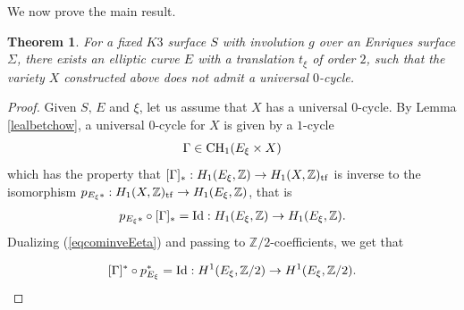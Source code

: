 \documentclass[10pt]{article}
\newtheorem{theo}{Theorem}[section]
\begin{document}
We now prove the main result.
\begin{theo} \label{theoexample} For a fixed $K3$ surface $S$ with involution $g$ over an Enriques surface $\Sigma$, there exists an elliptic curve  $E$ with a translation $t_\xi$ of order $2$, such that  the variety $X$ constructed above does not admit a universal $0$-cycle.
\end{theo}
\begin{proof} Given $S,\,E$ and $\xi$, let us assume that $X$ has a universal $0$-cycle.  By Lemma \ref{lealbetchow}, a universal $0$-cycle for $X$ is given by a $1$-cycle
$$\Gamma\in {\rm CH}_1(E_\xi\times X)
$$
which has the property that $[\Gamma]_*: H_1(E_\xi,\mathbb{Z})\rightarrow H_1(X,\mathbb{Z})_{\rm tf}$ is inverse to the isomorphism $p_{E_\xi*}:H_1(X,\mathbb{Z})_{\rm tf}\rightarrow  H_1(E_\xi,\mathbb{Z})$, that is
\begin{eqnarray}\label{eqcominveEeta} p_{E_\xi*}\circ [\Gamma]_*={\rm Id}: H_1(E_\xi,\mathbb{Z})\rightarrow H_1(E_\xi,\mathbb{Z}).
\end{eqnarray}
Dualizing (\ref{eqcominveEeta}) and passing to $\mathbb{Z}/2$-coefficients, we get that

\begin{eqnarray}\label{eqcominveEetadualmod2}  [\Gamma]^*\circ p_{E_\xi}^*={\rm Id}: H^1(E_\xi,\mathbb{Z}/2)\rightarrow H^1(E_\xi,\mathbb{Z}/2).
\end{eqnarray}



\end{proof}
\end{document}
